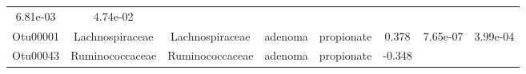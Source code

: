 \documentclass[11pt,]{article}
\begin{document}
\begin{longtable}[]{@{}cccccccc@{}}
\begin{minipage}[t]{0.08\columnwidth}
6.81e-03\strut
\end{minipage} & \begin{minipage}[t]{0.08\columnwidth}\centering\strut
4.74e-02\strut
\end{minipage}\tabularnewline
\begin{minipage}[t]{0.08\columnwidth}\centering\strut
Otu00001\strut
\end{minipage} & \begin{minipage}[t]{0.15\columnwidth}\centering\strut
Lachnospiraceae\strut
\end{minipage} & \begin{minipage}[t]{0.15\columnwidth}\centering\strut
Lachnospiraceae\strut
\end{minipage} & \begin{minipage}[t]{0.08\columnwidth}\centering\strut
adenoma\strut
\end{minipage} & \begin{minipage}[t]{0.09\columnwidth}\centering\strut
propionate\strut
\end{minipage} & \begin{minipage}[t]{0.07\columnwidth}\centering\strut
0.378\strut
\end{minipage} & \begin{minipage}[t]{0.08\columnwidth}\centering\strut
7.65e-07\strut
\end{minipage} & \begin{minipage}[t]{0.08\columnwidth}\centering\strut
3.99e-04\strut
\end{minipage}\tabularnewline
\begin{minipage}[t]{0.08\columnwidth}\centering\strut
Otu00043\strut
\end{minipage} & \begin{minipage}[t]{0.15\columnwidth}\centering\strut
Ruminococcaceae\strut
\end{minipage} & \begin{minipage}[t]{0.15\columnwidth}\centering\strut
Ruminococcaceae\strut
\end{minipage} & \begin{minipage}[t]{0.08\columnwidth}\centering\strut
adenoma\strut
\end{minipage} & \begin{minipage}[t]{0.09\columnwidth}\centering\strut
propionate\strut
\end{minipage} & \begin{minipage}[t]{0.07\columnwidth}\centering\strut
-0.348\strut
\end{minipage} & \begin{minipage}[t]{0.08\columnwidth}\centering\strut

\end{minipage}
\end{longtable}
\end{document}
